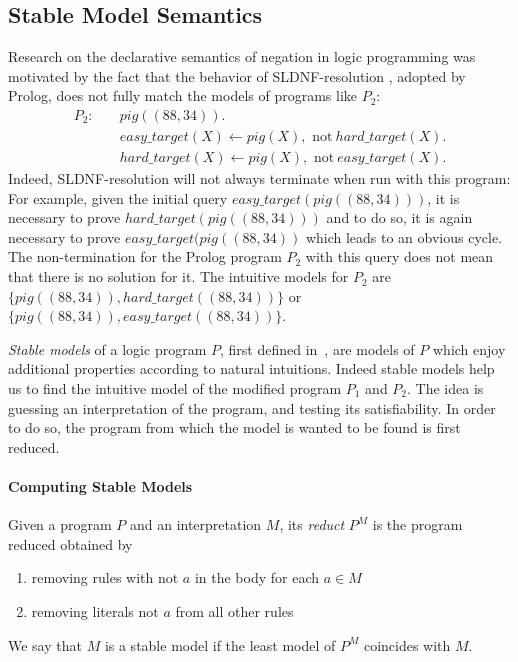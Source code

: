 \subsection{Stable Model Semantics}
Research on the declarative semantics of negation in logic programming was motivated by the fact that the behavior of SLDNF-resolution \cite{sldnf}, adopted by Prolog,  does not fully match the models of programs like \(P_2\):
\begin{align}
  P_2 \colon \quad
&\mathit{pig}((88,34)). \\
&\mathit{easy\_target}(X) \leftarrow pig(X), \text{ not}\: \mathit{hard\_target}(X). \label{eq:3}\\ 
&\mathit{hard\_target}(X) \leftarrow pig(X), \text{ not}\: \mathit{easy\_target}(X). \label{eq:4}
\end{align}
Indeed, SLDNF-resolution will not always terminate when run with this program: For example, given the initial query \(\mathit{easy\_target}(pig((88,34)))\), it is necessary to prove \(\mathit{hard\_target}(pig((88,34)))\) and to do so, it is again necessary to prove \(\mathit{easy\_target}(pig((88,34))\) which leads to an obvious cycle.
The non-termination for the Prolog program \(P_2\) with this query does not mean that there is no solution for it. The intuitive models for \(P_2\) are \(\{pig((88,34)), \mathit{hard\_target}((88,34))\}\) or \(\{pig((88,34)), \mathit{easy\_target}((88,34))\}\).

\emph{Stable models} of a logic program \(P\), first defined in~\cite{Gelfond-Lifschitz}, are models of \(P\) which enjoy additional properties according to natural intuitions.
Indeed stable models help us to find the intuitive model of the modified program \(P_1\) and \(P_2\). The idea is guessing an interpretation of the program, and testing its satisfiability. In order to do so, the program from which the model is wanted to be found is first reduced. 

\paragraph{Computing Stable Models} Given a program \(P\) and an interpretation \(M\), its \emph{reduct} \(P^M\) is the program reduced obtained by 
\begin{enumerate} 
\item removing rules with \(\text{not } a\) in the body for each \(a \in M\)
\item removing literals \(\text{not } a\) from all other rules %
\end{enumerate}
We say that \(M\) is a stable model if the least model of \(P^M\) coincides with \(M\).

